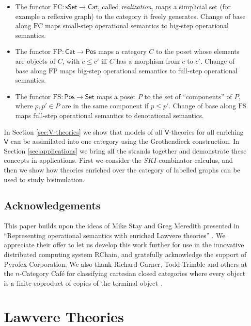 \documentclass{amsart}
\theoremstyle{definition}
\newcommand{\sSet}{\mathsf{sSet}}
\newcommand{\Set}{\mathsf{Set}}
\newcommand{\Cat}{\mathsf{Cat}}
\newcommand{\Pos}{\mathsf{Pos}}
\newcommand{\V}{\mathsf{V}}
\newcommand{\FC}{\mathrm{FC}}
\newcommand{\FP}{\mathrm{FP}}
\newcommand{\FS}{\mathrm{FS}}
\newcommand{\maps}{\colon}
\begin{document}
\begin{itemize}
\item
The functor $\FC \maps \sSet \to \Cat$, called \textit{realization}, maps a simplicial set (for example a reflexive graph) to the category it freely generates.  Change of base along $\FC$ maps small-step operational semantics to big-step operational semantics.
\item 
The functor $\FP \maps \Cat \to \Pos$ maps a category $C$ to the poset whose elements are objects of $C$, with $c \le c'$ iff $C$ has a morphism from $c$ to $c'$.
Change of base along $\FP$ maps big-step operational semantics to full-step operational semantics.
\item 
The functor $\FS \maps \Pos \to \Set$ maps a poset $P$ to the set of ``components'' of $P$, where $p,p' \in P$ are in the same component if $p \le p'$. Change of base along $\FS$ maps full-step operational semantics to denotational semantics.
\end{itemize}

In Section \ref{sec:V-theories} we show that models of all $\V$-theories for all enriching $\V$ can be assimilated into one category using the Grothendieck construction.  In Section \ref{sec:applications} we bring all the strands together and demonstrate these concepts in applications.  First we consider the $SKI$-combinator calculus, and then we show how theories enriched over the category of labelled graphs can be used to study bisimulation.

\subsection*{Acknowledgements}

This paper builds upon the ideas of Mike Stay and Greg Meredith presented in ``Representing operational semantics with enriched Lawvere theories''  \cite{roswelt}.  We appreciate their offer to let us develop this work further for use in the innovative distributed computing system RChain, and gratefully acknowledge the support of Pyrofex Corporation.  We also thank Richard Garner, Todd Trimble and others at the $n$-Category Caf\'e for classifying cartesian closed categories where every object is a finite coproduct of copies of the terminal object \cite{nCafe}.

\section{Lawvere Theories}
\label{sec:lawvere}
\end{document}
